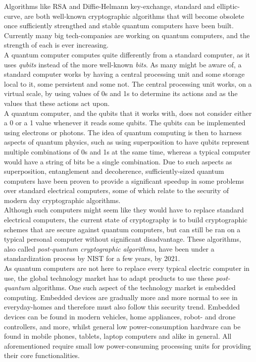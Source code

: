 Algorithms like RSA and Diffie-Helmann key-exchange, standard and elliptic-curve, are both well-known cryptographic algorithms that will become obsolete once sufficiently strengthed and stable quantum computers have been built. Currently many big tech-companies are working on quantum computers, and the strength of each is ever increasing.\medskip\\
A quantum computer computes quite differently from a standard computer, as it uses \emph{qubits} instead of the more well-known \emph{bits}. As many might be aware of, a standard computer works by having a central processing unit and some storage local to it, some persistent and some not. The central processing unit works, on a virtual scale, by using values of 0s and 1s to determine its actions and as the values that these actions act upon.\medskip\\
A quantum computer, and the qubits that it works with, does not consider either a 0 or a 1 value whenever it reads some qubits. The qubits can be implemented using electrons or photons. The idea of quantum computing is then to harness aspects of quantum physics, such as using superposition to have qubits represent multiple combinations of 0s and 1s at the same time, whereas a typical computer would have a string of bits be a single combination. Due to such aspects as superposition, entanglement and decoherence, sufficiently-sized quantum computers have been proven to provide a significant speedup in some problems over standard electrical computers, some of which relate to the security of modern day cryptographic algorithms.\medskip\\
Although such computers might seem like they would have to replace standard electrical computers, the current state of cryptography is to build cryptographic schemes that are secure against quantum computers, but can still be ran on a typical personal computer without significant disadvantage. These algorithms, also called \emph{post-quantum cryptographic algorithms}, have been under a standardization process by NIST for a few years, by 2021.\medskip\\
As quantum computers are not here to replace every typical electric computer in use, the global technology market has to adapt products to use these \emph{post-quantum} algorithms. One such aspect of the technology market is embedded computing. Embedded devices are gradually more and more normal to see in everyday-homes and therefore must also follow this security trend. Embedded devices can be found in modern vehicles, home appliances, robot- and drone controllers, and more, whilst general low power-consumption hardware can be found in mobile phones, tablets, laptop computers and alike in general. All aforementioned require small low power-consuming processing units for providing their core functionalities.\medskip\\
